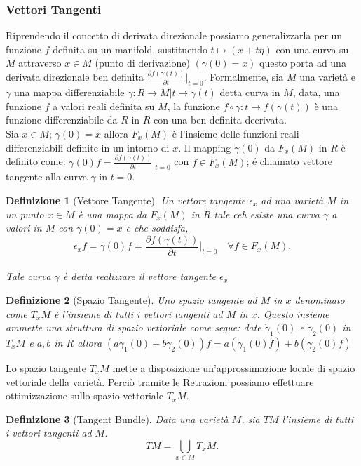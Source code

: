 \documentclass[a4paper, 12pt]{article}
\newtheorem{definition}{Definizione}
\begin{document}
\subsubsection{Vettori Tangenti}
Riprendendo il concetto di derivata direzionale possiamo generalizzarla per un funzione $f$ definita su un manifold, sustituendo $t \mapsto (x + t\eta)$ con una curva su $M$ attraverso $x \in M$ (punto di derivazione) $(\gamma (0) = x)$ questo porta ad una derivata direzionale ben definita $\frac{\partial f(\gamma (t))}{\partial t} \vert_{t=0}$. Formalmente, sia $M$ una varietà e $\gamma$ una mappa differenziabile $\gamma : R \to M | t \mapsto \gamma (t)$ detta curva in $M$, data, una funzione $f$ a valori reali definita su $M$, la funzione $f \circ \gamma : t \mapsto f(\gamma (t))$ è una funzione differenziabile da $R$ in $R$ con una ben definita deerivata.\\
Sia $x \in M$; $\gamma (0) = x$ allora $F_{x}(M)$ è l'insieme delle funzioni reali differenziabili definite in un intorno di $x$. Il mapping $\dot{\gamma} (0)$ da $F_x(M)$ in $R$ è definito come: $\dot{\gamma} (0) f = \frac{\partial f(\gamma (t))}{\partial t} \vert_{t=0}$ con $f \in F_x(M)$; é chiamato vettore tangente alla curva $\gamma$ in $t=0$.
\begin{definition}[Vettore Tangente]
Un vettore tangente $\epsilon_x$ ad una varietà $M$ in un punto $x \in M$ è una mappa da $F_x(M)$ in $R$ tale ceh esiste una curva $\gamma$ a valori in $M$ con $\gamma (0) = x$ e che soddisfa,\\
\[\epsilon_xf = \dot{\gamma (0)} f = \frac{\partial f(\gamma (t))}{\partial t} \vert_{t=0} \quad \forall f \in F_x(M).\]\\
Tale curva $\gamma$ è detta realizzare il vettore tangente $\epsilon_x$
\end{definition}
\begin{definition}[Spazio Tangente]
Uno spazio tangente ad $M$ in $x$ denominato come $T_xM$ è l'insieme di tutti i vettori tangenti ad $M$ in $x$. Questo insieme ammette una struttura di spazio vettoriale come segue: date $\dot{\gamma}_1 (0)$ e $\dot{\gamma}_2 (0)$ in $T_xM$ e $a, b$ in $R$ allora $(a \dot{\gamma}_1 (0) + b \dot{\gamma}_2 (0)) f = a (\dot{\gamma}_1 (0) f) + b (\dot{\gamma}_2 (0) f)$
\end{definition}
Lo spazio tangente $T_xM$ mette a disposizione un'approssimazione locale di spazio vettoriale della varietà. Perciò tramite le Retrazioni possiamo effettuare ottimizzazione sullo spazio vettoriale $T_xM$.
\begin{definition}[Tangent Bundle]
Data una varietà $M$, sia $TM$ l'insieme di tutti i vettori tangenti ad $M$.\\
\[TM = \bigcup_{x \in M} T_xM.\]
\end{definition}
\end{document}
